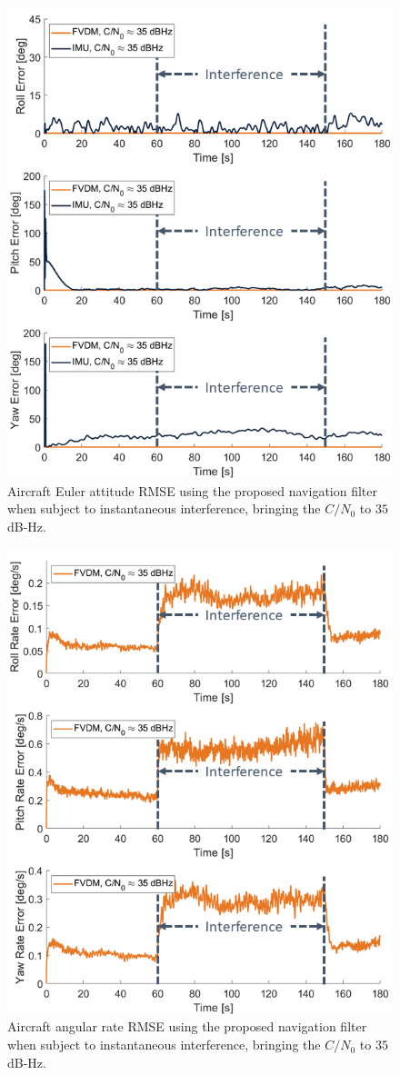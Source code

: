 \documentclass[12pt]{report}
\begin{document}
\begin{figure}[!ht]
  \centering
  \includegraphics[width=0.75\linewidth]{Figures/Results/trajectoryfigure/Slide6.PNG}
  \caption{Aircraft Euler attitude RMSE using the proposed navigation filter when subject to instantaneous interference, bringing the \(C/N_0\) to \(35\) dB-Hz.}\label{fig:Eul35}
\end{figure}


\begin{figure}[!ht]
  \centering
  \includegraphics[width=0.75\linewidth]{Figures/Results/trajectoryfigure/Slide12.PNG}
  \caption{Aircraft angular rate RMSE using the proposed navigation filter when subject to instantaneous interference, bringing the \(C/N_0\) to \(35\) dB-Hz.}\label{fig:Ang35}
\end{figure}
\end{document}
